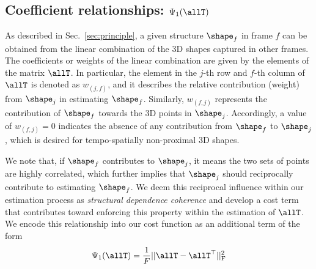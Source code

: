 \subsection{Coefficient relationships: $\Psi_1(\allT)$}
As described in Sec.~\ref{sec:principle}, a given structure $\shape_f$ in frame $f$ can be obtained from the linear combination of the 3D shapes captured in other frames. The coefficients or weights of the linear combination are given by the elements of the matrix $\allT$. In particular, the element in the $j$-th row and $f$-th column  of $\allT$ is denoted as $w_{(j,f)}$, and it describes the relative contribution (weight) from $\shape_{j}$ in estimating $\shape_{f}$.
Similarly, $w_{(f,j)}$ represents the contribution of $\shape_{f}$ towards the 3D points in $\shape_{j}$.
Accordingly, a value of $w_{(f,j)}=0$ indicates the absence of any contribution from $\shape_{f}$ to $\shape_{j}$, which is desired for tempo-spatially non-proximal 3D shapes.

We note that, if $\shape_{f}$ contributes to $\shape_{j}$, it means the two sets of points are highly correlated, which
further implies that  $\shape_{j}$ should reciprocally contribute to estimating $\shape_{f}$.
We deem this reciprocal influence within our estimation process as {\em structural dependence coherence} and develop a cost term that
contributes toward enforcing this property within the estimation of $\allT$.
We encode this relationship into our cost function as an additional term of the form %
\begin{equation}
\Psi_1(\allT) = \frac{1}{F} ||\allT-\allT^\top||_\text{F}^2
\end{equation}

